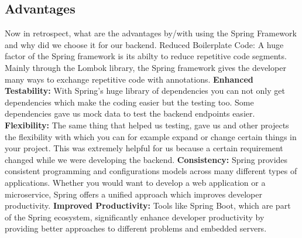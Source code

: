     \subsection{Advantages}
    Now in retrospect, what are the advantages by/with using the Spring Framework and why did we choose it for our backend.
    Reduced Boilerplate Code: A huge factor of the Spring framework is its abilty to reduce repetitive code segments. Mainly through the Lombok library, the Spring framework gives the developer many ways to exchange repetitive code with annotations. \newline 
    \textbf{Enhanced Testability:} \newline
    With Spring's huge library of dependencies you can not only get dependencies which make the coding easier but the testing too. Some dependencies gave us mock data to test the backend endpoints easier.\newline
    \textbf{Flexibility:} \newline
    The same thing that helped us testing, gave us and other projects the flexibility with which you can for example expand or change certain things in your project. This was extremely helpful for us because a certain requirement changed while we were developing the backend.\newline
    \textbf{Consistency:} \newline
    Spring provides consistent programming and configurations models across many different types of applications. Whether you would want to develop a web application or a microservice, Spring offers a unified approach which improves developer productivity.\newline
    \textbf{Improved Productivity:} \newline
    Tools like Spring Boot, which are part of the Spring ecosystem, significantly enhance developer productivity by providing better approaches to different problems and embedded servers.\newline 
    